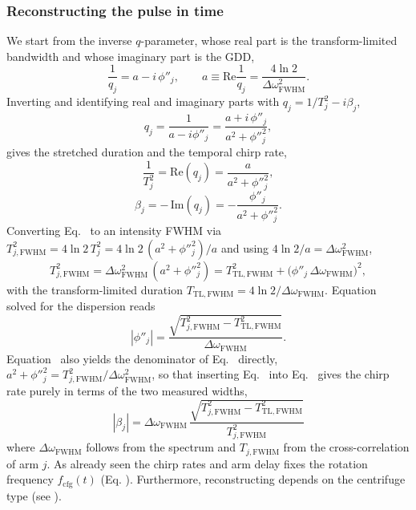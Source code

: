 \subsubsection{Reconstructing the pulse in time}

We start from the inverse $q$-parameter, whose real part is the transform-limited bandwidth and whose imaginary part is the GDD,
\begin{equation}
    \frac{1}{q_j} = a - i\,\phi''_j , \qquad a \equiv \mathrm{Re}\frac{1}{q_j} = \frac{4\ln 2}{\Delta\omega_\mathrm{FWHM}^2}.
    \label{eq:inverse_q}
\end{equation}
Inverting and identifying real and imaginary parts with $q_j = 1/T_j^2 - i\beta_j$,
\begin{equation}
    q_j = \frac{1}{a - i\phi''_j} = \frac{a + i\,\phi''_j}{a^2 + \phi''^2_j},
    \label{eq:q_inverted}
\end{equation}
gives the stretched duration and the temporal chirp rate,
\begin{equation}
    \frac{1}{T_j^2} = \mathrm{Re}(q_j) = \frac{a}{a^2+\phi''^2_j},
    \label{eq:duration}
\end{equation}
\begin{equation}
    \beta_j = -\,\mathrm{Im}(q_j) = -\frac{\phi''_j}{a^2+\phi''^2_j}.
    \label{eq:beta_gdd}
\end{equation}
Converting Eq.~ to an intensity FWHM via $T_{j,\mathrm{FWHM}}^2 = 4\ln 2\,T_j^2 = 4\ln 2\,(a^2+\phi''^2_j)/a$ and using $4\ln 2/a = \Delta\omega_\mathrm{FWHM}^2$,
\begin{equation}
    T_{j,\mathrm{FWHM}}^2 = \Delta\omega_\mathrm{FWHM}^2\,(a^2 + \phi''^2_j) = T_{\mathrm{TL},\mathrm{FWHM}}^2 + \big(\phi''_j\,\Delta\omega_\mathrm{FWHM}\big)^2,
    \label{eq:B}
\end{equation}
with the transform-limited duration $T_{\mathrm{TL},\mathrm{FWHM}} = 4\ln 2/\Delta\omega_\mathrm{FWHM}$. Equation~ solved for the dispersion reads
\begin{equation}
    |\phi''_j| = \frac{\sqrt{T_{j,\mathrm{FWHM}}^2 - T_{\mathrm{TL},\mathrm{FWHM}}^2}}{\Delta\omega_\mathrm{FWHM}}.
    \label{eq:phi}
\end{equation}
Equation~ also yields the denominator of Eq.~ directly, $a^2 + \phi''^2_j = T_{j,\mathrm{FWHM}}^2/\Delta\omega_\mathrm{FWHM}^2$, so that inserting Eq.~ into Eq.~ gives the chirp rate purely in terms of the two measured widths,
\begin{equation}
    |\beta_j| = \Delta\omega_\mathrm{FWHM}\, \frac{\sqrt{T_{j,\mathrm{FWHM}}^2 - T_{\mathrm{TL},\mathrm{FWHM}}^2}}{T_{j,\mathrm{FWHM}}^2}
    \label{eq:chirp_from_widths}
\end{equation}
where $\Delta\omega_\mathrm{FWHM}$ follows from the spectrum and $T_{j,\mathrm{FWHM}}$ from the cross-correlation of arm $j$.
As already seen the chirp rates and arm delay fixes the rotation frequency $f_{\mathrm{cfg}}(t)$ (Eq. ). Furthermore, reconstructing depends on the centrifuge type (see ).


